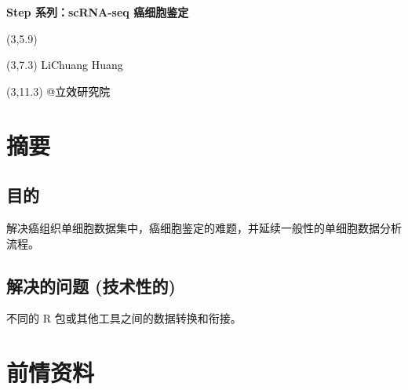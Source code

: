 \documentclass[
]{article}
\author{}
\date{\vspace{-2.5em}}
\begin{document}
\begin{titlepage} 
\begin{center} \textbf{\Huge Step 系列：scRNA-seq
癌细胞鉴定} \vspace{4em}
\begin{textblock}{10}(3,5.9) \huge
\textbf{\textcolor{white}{2024-02-21}}
\end{textblock} \begin{textblock}{10}(3,7.3)
\Large \textcolor{black}{LiChuang Huang}
\end{textblock} \begin{textblock}{10}(3,11.3)
\Large \textcolor{black}{@立效研究院}
\end{textblock} \end{center} \end{titlepage}
\restoregeometry


\tableofcontents

\listoffigures

\listoftables

\newpage


\hypertarget{abstract}{%
\section{摘要}\label{abstract}}

\hypertarget{ux76eeux7684}{%
\subsection{目的}\label{ux76eeux7684}}

解决癌组织单细胞数据集中，癌细胞鉴定的难题，并延续一般性的单细胞数据分析流程。

\hypertarget{ux89e3ux51b3ux7684ux95eeux9898-ux6280ux672fux6027ux7684}{%
\subsection{解决的问题 (技术性的)}\label{ux89e3ux51b3ux7684ux95eeux9898-ux6280ux672fux6027ux7684}}

不同的 R 包或其他工具之间的数据转换和衔接。

\hypertarget{ux524dux60c5ux8d44ux6599}{%
\section{前情资料}\label{ux524dux60c5ux8d44ux6599}}
\end{document}
